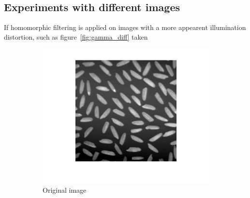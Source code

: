		\subsection{Experiments with different images}
		If homomorphic filtering is applied on images with a more appearent
		illumination distortion, such as figure~\ref{fig:gamma_diff} taken
		\begin{figure}[h!]
        \centering
		\begin{subfigure}[b]{0.6\textwidth}
                \includegraphics[width=\textwidth]{pics/microbes_before.png}
                \caption{Original image}
                \label{fig:microbe_before}
        \end{subfigure}%
        \begin{subfigure}[b]{0.6\textwidth}

\end{subfigure}
\end{figure}
